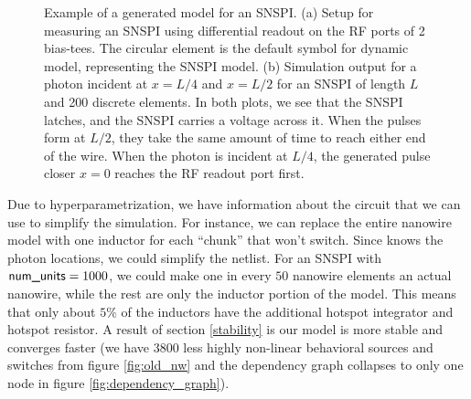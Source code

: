 \begin{figure}
    \centering
    \caption{Example of a  generated model for an SNSPI. (a) Setup
    for measuring an SNSPI using differential readout on the RF ports of 2 bias-tees.
    The circular element is the default symbol for  dynamic model, 
    representing the SNSPI model. (b) Simulation output for a photon incident at
    $x=L/4$ and $x=L/2$ for an SNSPI of length $L$ and 200 discrete elements. 
    In both plots, we see that the SNSPI latches, and the SNSPI carries
    a voltage across it.
    When the pulses form at $L/2$, they take the same amount of time to reach 
    either end of the wire.
    When the photon is incident at $L/4$, the generated pulse closer $x=0$ reaches
    the RF readout port first.}
    \label{fig:snspi_run}
\end{figure}

Due to hyperparametrization, we have information about the circuit that we can use to
simplify the simulation. For instance, we can replace the entire nanowire model with
one inductor for each ``chunk'' that won't switch. Since  knows the 
photon locations, we could simplify the netlist. For an SNSPI with $\textnormal{\textsf{num\_units}}=1000$,
we could make one in every $50$ nanowire elements an actual nanowire, while the
rest are only the inductor portion of the model. This means that only about $5\%$ of the inductors
have the additional hotspot integrator and hotspot resistor. A result of section 
\ref{stability} is our model is more stable and converges faster (we have $3800$ less
highly non-linear behavioral sources and switches from figure \ref{fig:old_nw} and 
the dependency graph collapses
to only one node in figure \ref{fig:dependency_graph}).

